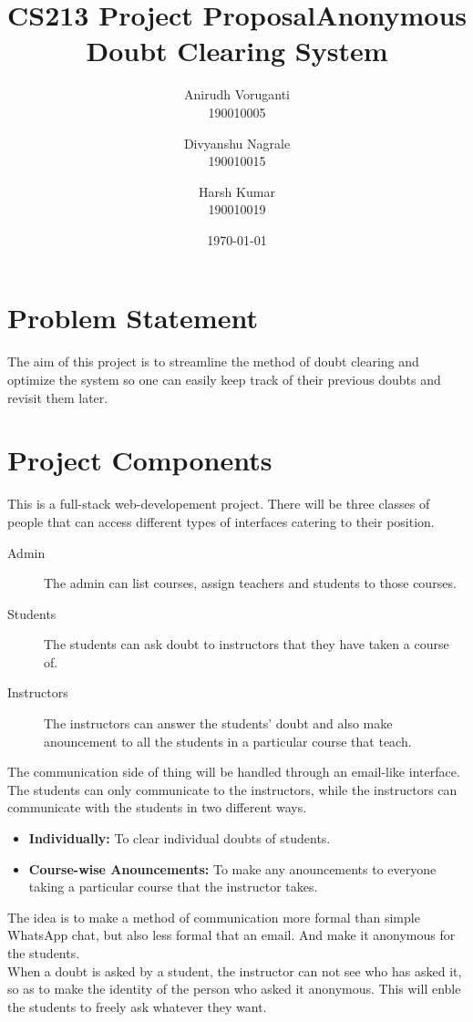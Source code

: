 \documentclass{article}
\begin{document}
\title{CS213 Project Proposal}
\author{
    Anirudh Voruganti
    \\ 190010005
    \and
    Divyanshu Nagrale
    \\ 190010015
    \and
    Harsh Kumar
    \\ 190010019
}
\date{\today}
\maketitle

\pagebreak

\title{Anonymous Doubt Clearing System}
\author{}
\date{}
\maketitle

\section{Problem Statement}
The aim of this project is to streamline the method of
doubt clearing and optimize the system so one can easily
keep track of their previous doubts and revisit them later.

\section{Project Components}
This is a full-stack web-developement project. There will be three classes of people
that can access different types of interfaces catering to
their position.
\begin{description}
    \item[Admin] The admin can list courses, assign teachers and students to those courses.
    \item[Students] The students can ask doubt to instructors that they have taken a course of.
    \item[Instructors] The instructors can answer the students' doubt and also make anouncement to all the students in a particular course that teach.
\end{description}
The communication side of thing will be handled through an
email-like interface. The students can only communicate to
the instructors, while the instructors can communicate with
the students in two different ways.
\begin{itemize}
    \item \textbf{Individually:} To clear individual doubts of students.
    \item \textbf{Course-wise Anouncements:} To make any anouncements to everyone taking a particular course that the instructor takes.
\end{itemize}
The idea is to make a method of communication more formal than 
simple WhatsApp chat, but also less formal that an email. And 
make it anonymous for the students.\\
When a doubt is asked by a student, the instructor can not
see who has asked it, so as to make the identity of the 
person who asked it anonymous. This will enble the students to
freely ask whatever they want.
\end{document}

